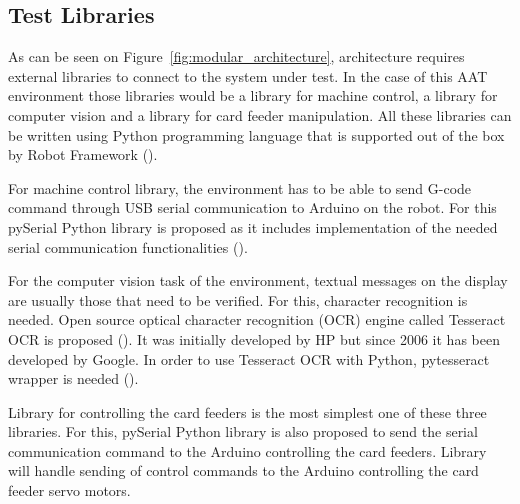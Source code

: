 \FloatBarrier
\subsection{Test Libraries}
\label{subsection:test libraries}

As can be seen on Figure~\ref{fig:modular_architecture}, architecture requires external libraries to connect to the system under test. In the case of this AAT environment those libraries would be a library for machine control, a library for computer vision and a library for card feeder manipulation. All these libraries can be written using Python programming language that is supported out of the box by Robot Framework (\emph{\citep{robotframework}}).

For machine control library, the environment has to be able to send G-code command through USB serial communication to Arduino on the robot. For this pySerial Python library is proposed as it includes implementation of the needed serial communication functionalities (\emph{\citep{pyserial}}).

For the computer vision task of the environment, textual messages on the display are usually those that need to be verified. For this, character recognition is needed. Open source optical character recognition (OCR) engine called Tesseract OCR is proposed (\emph{\citep{tesseract}}). It was initially developed by HP but since 2006 it has been developed by Google. In order to use Tesseract OCR with Python, pytesseract wrapper is needed (\emph{\citep{pytesseract}}).

Library for controlling the card feeders is the most simplest one of these three libraries. For this, pySerial Python library is also proposed to send the serial communication command to the Arduino controlling the card feeders. Library will handle sending of control commands to the Arduino controlling the card feeder servo motors.
